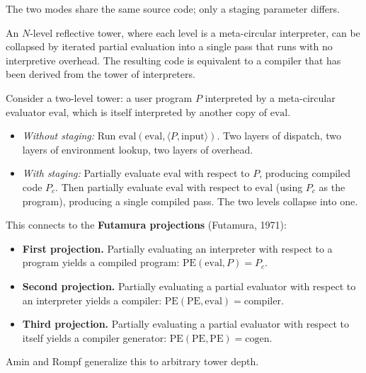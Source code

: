 The two modes share the same source code; only a staging parameter differs.

\begin{theorem}
An $N$-level reflective tower, where each level is a meta-circular interpreter, can be collapsed by iterated partial evaluation into a single pass that runs with no interpretive overhead. The resulting code is equivalent to a compiler that has been derived from the tower of interpreters.
\end{theorem}

\begin{example}
Consider a two-level tower: a user program $P$ interpreted by a meta-circular evaluator $\text{eval}$, which is itself interpreted by another copy of $\text{eval}$.
\end{example}

\begin{itemize}
  \item \textit{Without staging:} Run $\text{eval}(\text{eval}, \langle P, \text{input}\rangle)$. Two layers of dispatch, two layers of environment lookup, two layers of overhead.
  \item \textit{With staging:} Partially evaluate $\text{eval}$ with respect to $P$, producing compiled code $P_c$. Then partially evaluate $\text{eval}$ with respect to $\text{eval}$ (using $P_c$ as the program), producing a single compiled pass. The two levels collapse into one.
\end{itemize}

This connects to the \textbf{Futamura projections} (Futamura, 1971):

\begin{itemize}
  \item \textbf{First projection.} Partially evaluating an interpreter with respect to a program yields a compiled program: $\text{PE}(\text{eval}, P) = P_c$.
  \item \textbf{Second projection.} Partially evaluating a partial evaluator with respect to an interpreter yields a compiler: $\text{PE}(\text{PE}, \text{eval}) = \text{compiler}$.
  \item \textbf{Third projection.} Partially evaluating a partial evaluator with respect to itself yields a compiler generator: $\text{PE}(\text{PE}, \text{PE}) = \text{cogen}$.
\end{itemize}

Amin and Rompf generalize this to arbitrary tower depth.

